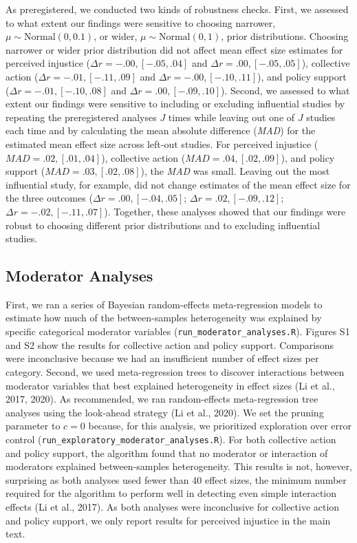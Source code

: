 \documentclass[12pt, letterpaper]{article}
\begin{document}
As preregistered, we conducted two kinds of robustness checks. First, we
assessed to what extent our findings were sensitive to choosing
narrower, \(\mu \sim \text{Normal}(0, 0.1)\), or wider,
\(\mu \sim \text{Normal}(0, 1)\), prior distributions. Choosing narrower
or wider prior distribution did not affect mean effect size estimates
for perceived injustice (\(\Delta r = -.00, [-.05, .04]\) and
\(\Delta r = .00, [-.05, .05]\)), collective action
(\(\Delta r = -.01, [-.11, .09]\) and \(\Delta r = -.00, [-.10, .11]\)),
and policy support (\(\Delta r = -.01, [-.10, .08]\) and
\(\Delta r = .00, [-.09, .10]\)). Second, we assessed to what extent our
findings were sensitive to including or excluding influential studies by
repeating the preregistered analyses \(J\) times while leaving out one
of \(J\) studies each time and by calculating the mean absolute
difference (\emph{MAD}) for the estimated mean effect size across
left-out studies. For perceived injustice
(\(\textit{MAD} = .02, [.01, .04]\)), collective action
(\(\textit{MAD} = .04, [.02, .09]\)), and policy support
(\(\textit{MAD} = .03, [.02, .08]\)), the \emph{MAD} was small. Leaving
out the most influential study, for example, did not change estimates of
the mean effect size for the three outcomes
(\(\Delta r = .00, [-.04, .05]\); \(\Delta r = .02, [-.09, .12]\);
\(\Delta r = -.02, [-.11, .07]\)). Together, these analyses showed that
our findings were robust to choosing different prior distributions and
to excluding influential studies.

\hypertarget{moderator-analyses}{%
\subsection{Moderator Analyses}\label{moderator-analyses}}

First, we ran a series of Bayesian random-effects meta-regression models
to estimate how much of the between-samples heterogeneity was explained
by specific categorical moderator variables
(\texttt{run\_moderator\_analyses.R}). Figures S1 and S2 show the
results for collective action and policy support. Comparisons were
inconclusive because we had an insufficient number of effect sizes per
category. Second, we used meta-regression trees to discover interactions
between moderator variables that best explained heterogeneity in effect
sizes (Li et al., 2017, 2020). As recommended, we ran random-effects
meta-regression tree analyses using the look-ahead strategy (Li et al.,
2020). We set the pruning parameter to \(c = 0\) because, for this
analysis, we prioritized exploration over error control
(\texttt{run\_exploratory\_moderator\_analyses.R}). For both collective
action and policy support, the algorithm found that no moderator or
interaction of moderators explained between-samples heterogeneity. This
results is not, however, surprising as both analyses used fewer than 40
effect sizes, the minimum number required for the algorithm to perform
well in detecting even simple interaction effects (Li et al., 2017). As
both analyses were inconclusive for collective action and policy
support, we only report results for perceived injustice in the main
text.
\end{document}
